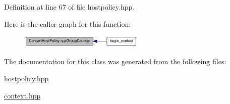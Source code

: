 Definition at line 67 of file hostpolicy.hpp.

Here is the caller graph for this function:\nopagebreak
\begin{figure}[H]
\begin{center}
\leavevmode
\includegraphics[width=169pt]{class_context_host_policy_a7705f176010456efe3dfed9cbb351e2b_icgraph}
\end{center}
\end{figure}


The documentation for this class was generated from the following files:\begin{DoxyCompactItemize}
\item 
\hyperlink{hostpolicy_8hpp}{hostpolicy.hpp}\item 
\hyperlink{context_8hpp}{context.hpp}\end{DoxyCompactItemize}
